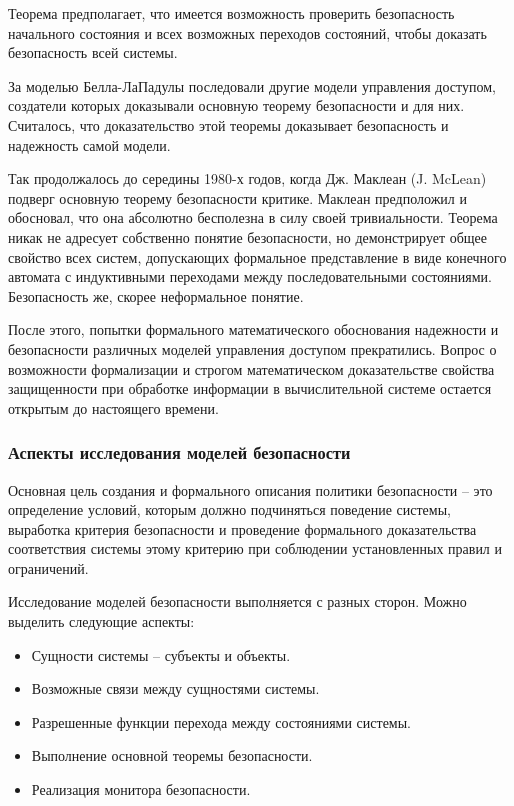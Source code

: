 Теорема предполагает, что имеется возможность проверить безопасность начального состояния и всех возможных переходов состояний, чтобы доказать безопасность всей системы. 

За моделью Белла-ЛаПадулы последовали другие модели управления доступом, создатели которых доказывали основную теорему безопасности и для них. Считалось, что доказательство этой теоремы доказывает безопасность и надежность самой модели. 

Так продолжалось до середины 1980-х годов, когда Дж. Маклеан (J. McLean) подверг основную теорему безопасности критике. Маклеан предположил и обосновал, что она абсолютно бесполезна в силу своей тривиальности. Теорема никак не адресует собственно понятие безопасности, но демонстрирует общее свойство всех систем, допускающих формальное представление в виде конечного автомата с индуктивными переходами между последовательными состояниями. Безопасность же, скорее неформальное понятие. 

После этого, попытки формального математического обоснования надежности и безопасности различных моделей управления доступом прекратились. Вопрос о возможности формализации и строгом математическом доказательстве свойства защищенности при обработке информации в вычислительной системе остается открытым до настоящего времени. 

\subsubsection{Аспекты исследования моделей безопасности}

Основная цель создания и формального описания политики безопасности -- это определение условий, которым должно подчиняться поведение системы, выработка критерия безопасности и проведение формального доказательства соответствия системы этому критерию при соблюдении установленных правил и ограничений.

Исследование моделей безопасности выполняется с разных сторон. Можно выделить следующие аспекты:

\begin{itemize}
	\item Сущности системы -- субъекты и объекты.
	\item Возможные связи между сущностями системы.
	\item Разрешенные функции перехода между состояниями системы.
	\item Выполнение основной теоремы безопасности.
	\item Реализация монитора безопасности.
\end{itemize}

